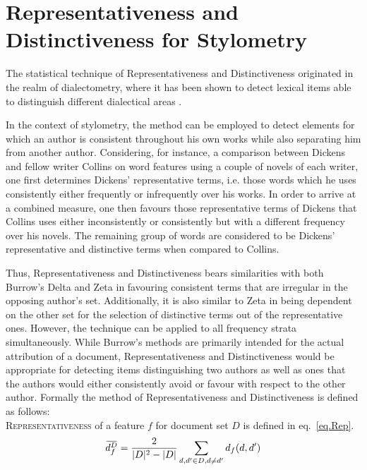 \documentclass[a4paper,10pt,twoside,fleqn]{article}
\newcommand{\overbar}[1]{\mkern 2.0mu\overline{\mkern-2.0mu#1\mkern-2.0mu}\mkern 2.0mu}
\begin{document}
\section{Representativeness and Distinctiveness for Stylometry} \label{sec:method}
The statistical technique of Representativeness and Distinctiveness
originated in the realm of dialectometry, where it has been
shown to detect lexical items able to distinguish different dialectical
areas \cite{prokic2012detecting}.

In the context of stylometry, the method can be employed to detect elements for
which an author is consistent throughout his own works while also separating him
from another author.
Considering, for instance, a comparison between Dickens and fellow
writer Collins on word features using a couple of novels of each writer,
one first determines Dickens' representative terms, i.e. those words which he
uses consistently either frequently or infrequently over his works.
In order to arrive at a combined measure, one then favours those representative
terms of Dickens that Collins uses either inconsistently or consistently but with a
different frequency over his novels. The remaining group of words are considered
to be Dickens' representative and distinctive terms when compared to Collins.

Thus, Representativeness and Distinctiveness bears similarities with both
Burrow's Delta \cite{Burrows2002delta} and Zeta  \cite{Burrows2007all} in
favouring consistent terms that are irregular in the opposing author's set.
Additionally, it is also similar to Zeta in being dependent on the other set
for the selection of distinctive terms out of the representative ones.
However, the technique can be applied to all frequency strata simultaneously.
While Burrow's methods are primarily intended for the actual attribution
of a document, Representativeness and Distinctiveness would be appropriate
for detecting items distinguishing two authors as well as ones that
the authors would either consistently avoid or favour with respect to
the other author.
Formally the method of Representativeness and Distinctiveness is defined
as follows: \\

\textsc{Representativeness} of a feature $f$ for document set $D$ is defined
in eq.~\ref{eq.Rep}. \\


 \begin{equation}\label{eq.Rep}
 \overbar{d_f^{D}} = \frac{2}{|D|^2 -|D|} \sum\limits_{d,d' \in D,d \neq d'} d_f(d,d')
 \end{equation}
\end{document}
